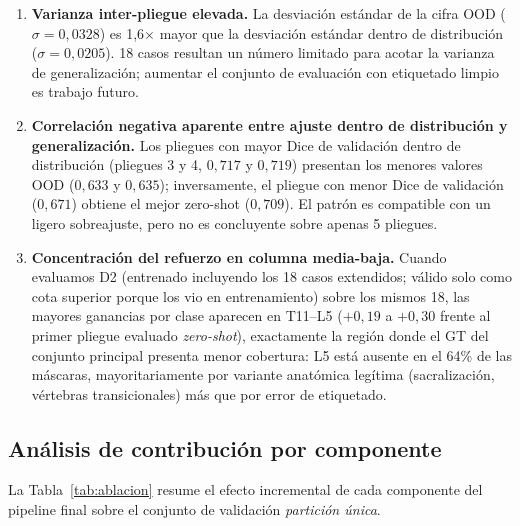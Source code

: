 \documentclass[conference]{IEEEtran}
\begin{document}
\begin{enumerate}
\item \textbf{Varianza inter-pliegue elevada.} La desviación estándar de la cifra OOD ($\sigma = 0{,}0328$) es 1{,}6$\times$ mayor que la desviación estándar dentro de distribución ($\sigma = 0{,}0205$). 18 casos resultan un número limitado para acotar la varianza de generalización; aumentar el conjunto de evaluación con etiquetado limpio es trabajo futuro.
\item \textbf{Correlación negativa aparente entre ajuste dentro de distribución y generalización.} Los pliegues con mayor Dice de validación dentro de distribución (pliegues 3 y 4, $0{,}717$ y $0{,}719$) presentan los menores valores OOD ($0{,}633$ y $0{,}635$); inversamente, el pliegue con menor Dice de validación ($0{,}671$) obtiene el mejor zero-shot ($0{,}709$). El patrón es compatible con un ligero sobreajuste, pero no es concluyente sobre apenas 5 pliegues.
\item \textbf{Concentración del refuerzo en columna media-baja.} Cuando evaluamos D2 (entrenado incluyendo los 18 casos extendidos; válido solo como cota superior porque los vio en entrenamiento) sobre los mismos 18, las mayores ganancias por clase aparecen en T11--L5 ($+0{,}19$ a $+0{,}30$ frente al primer pliegue evaluado \emph{zero-shot}), exactamente la región donde el GT del conjunto principal presenta menor cobertura: L5 está ausente en el 64\% de las máscaras, mayoritariamente por variante anatómica legítima (sacralización, vértebras transicionales) más que por error de etiquetado.
\end{enumerate}

\subsection{Análisis de contribución por componente}
\label{sec:ablacion}

La Tabla~\ref{tab:ablacion} resume el efecto incremental de cada componente del pipeline final sobre el conjunto de validación \emph{partición única}.
\end{document}
